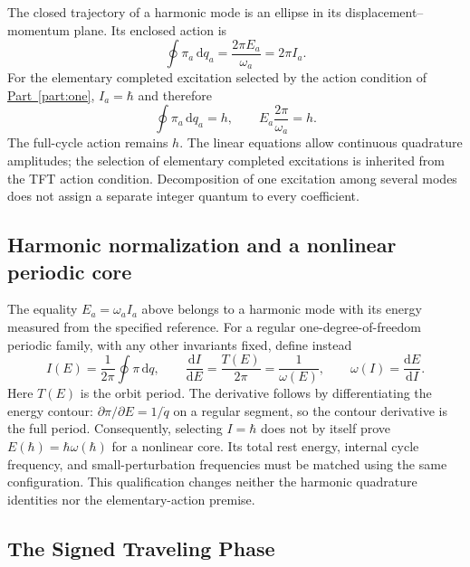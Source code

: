The closed trajectory of a harmonic mode is an ellipse in its displacement--momentum plane. Its enclosed action is
\begin{equation}
    \oint\pi_a\,\mathrm dq_a
    =\frac{2\pi E_a}{\omega_a}=2\pi I_a.
\end{equation}
For the elementary completed excitation selected by the action condition of \hyperref[part:one]{Part~\ref*{part:one}}, $I_a=\hbar$ and therefore
\begin{equation}
    \boxed{
    \oint\pi_a\,\mathrm dq_a=h,
    \qquad
    E_a\frac{2\pi}{\omega_a}=h
    }.
    \label{eq:X_complete_cycle}
\end{equation}
The full-cycle action remains $h$. The linear equations allow continuous quadrature amplitudes; the selection of elementary completed excitations is inherited from the TFT action condition. Decomposition of one excitation among several modes does not assign a separate integer quantum to every coefficient.

\subsection*{Harmonic normalization and a nonlinear periodic core}
\label{sec:X_nonlinear_action_diagnostic}

The equality $E_a=\omega_a I_a$ above belongs to a harmonic mode with its energy measured from the specified reference. For a regular one-degree-of-freedom periodic family, with any other invariants fixed, define instead
\[
 I(E)=\frac1{2\pi}\oint\pi\,\mathrm dq,
 \qquad \frac{\mathrm dI}{\mathrm dE}
 =\frac{T(E)}{2\pi}=\frac1{\omega(E)},
 \qquad \omega(I)=\frac{\mathrm dE}{\mathrm dI}.
\]
Here $T(E)$ is the orbit period. The derivative follows by differentiating the energy contour: $\partial\pi/\partial E=1/\dot q$ on a regular segment, so the contour derivative is the full period. Consequently, selecting $I=\hbar$ does not by itself prove $E(\hbar)=\hbar\omega(\hbar)$ for a nonlinear core. Its total rest energy, internal cycle frequency, and small-perturbation frequencies must be matched using the same configuration. This qualification changes neither the harmonic quadrature identities nor the elementary-action premise.

\subsection{The Signed Traveling Phase}

